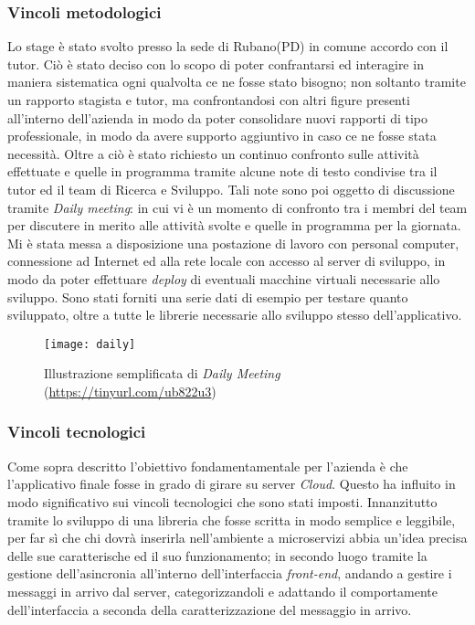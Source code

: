 \subsubsection{Vincoli metodologici}
Lo stage è stato svolto presso la sede di Rubano(PD) in comune accordo con il tutor. Ciò è stato deciso con lo scopo di poter confrantarsi ed interagire in maniera sistematica ogni qualvolta ce ne fosse stato bisogno; non soltanto tramite un rapporto stagista e tutor, ma confrontandosi con altri figure presenti all'interno dell'azienda in modo da poter consolidare nuovi rapporti di tipo professionale, in modo da avere supporto aggiuntivo in caso ce ne fosse stata necessità.
Oltre a ciò è stato richiesto un continuo confronto sulle attività effettuate e quelle in programma tramite alcune note di testo condivise tra il tutor ed il team di Ricerca e Sviluppo.
Tali note sono poi oggetto di discussione tramite \textit{Daily meeting}: in cui vi è un momento di confronto tra i membri del team per discutere in merito alle attività svolte e quelle in programma per la giornata. Mi è stata messa a disposizione una postazione di lavoro con personal computer, connessione ad Internet ed alla rete locale con accesso al server di sviluppo, in modo da poter effettuare \textit{deploy} di eventuali macchine virtuali necessarie allo sviluppo. Sono stati forniti una serie dati di esempio per testare quanto sviluppato, oltre a tutte le librerie necessarie allo sviluppo stesso dell’applicativo.
\begin{figure}[!h] 
	\centering 
	\texttt{[image: daily]} 
	\caption{Illustrazione semplificata di \textit{Daily Meeting} (\url{https://tinyurl.com/ub822u3})}
\end{figure}
\subsubsection{Vincoli tecnologici}
Come sopra descritto l'obiettivo fondamentamentale per l'azienda è che l'applicativo finale fosse in grado di girare su server \textit{Cloud}. Questo ha influito in modo significativo sui vincoli tecnologici che sono stati imposti. Innanzitutto tramite lo sviluppo di una libreria che fosse scritta in modo semplice e leggibile, per far sì che chi dovrà inserirla nell'ambiente a microservizi abbia un'idea precisa delle sue caratterische ed il suo funzionamento; in secondo luogo tramite la gestione dell'asincronia all'interno dell'interfaccia \textit{front-end}, andando a gestire i messaggi in arrivo dal server, categorizzandoli e adattando il comportamente dell'interfaccia a seconda della caratterizzazione del messaggio in arrivo.
